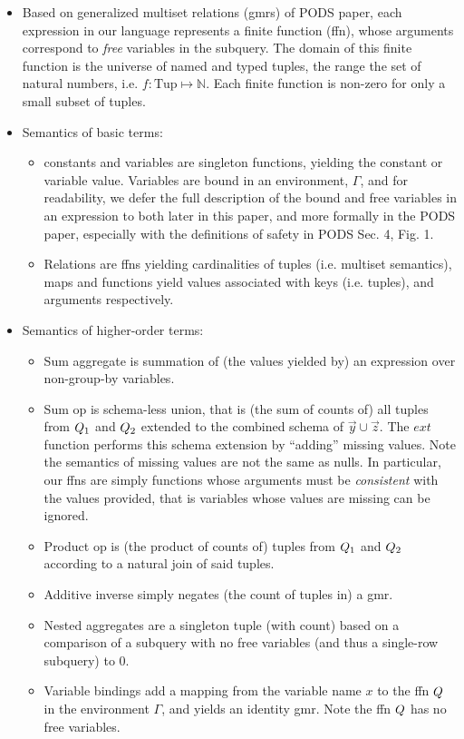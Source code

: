 \begin{itemize}
  \item Based on generalized multiset relations (gmrs) of PODS paper, each
  expression in our language represents a finite function (ffn), whose
  arguments correspond to \textit{free} variables in the subquery. The domain
  of this finite function is the universe of named and typed tuples, the range
  the set of natural numbers, i.e. $f : \mbox{Tup} \mapsto \mathbb{N}$. Each
  finite function is non-zero for only a small subset of tuples.
  \item Semantics of basic terms:
  \begin{itemize}
    \item constants and variables are singleton functions, yielding the
    constant or variable value. Variables are bound in an environment,
    $\Gamma$, and for readability, we defer the full description of the bound
    and free variables in an expression to both later in this paper, and more
    formally in the PODS paper, especially with the definitions of safety in
    PODS Sec. 4, Fig. 1.
    \item Relations are ffns yielding cardinalities of tuples (i.e. multiset
    semantics), maps and functions yield values associated with keys (i.e.
    tuples), and arguments respectively.
  \end{itemize} 
  
  \item Semantics of higher-order terms:
  \begin{itemize}
    \item Sum aggregate is summation of (the values yielded by) an expression
    over non-group-by variables.
    \item Sum op is schema-less union, that is (the sum of counts of) all tuples
    from $Q_1$ and $Q_2$ extended to the combined schema of $\vec{y} \cup
    \vec{z}$. The $ext$ function performs this schema extension by ``adding''
    missing values. Note the semantics of missing values are not the same as
    nulls. In particular, our ffns are simply functions whose arguments must be
    \textit{consistent} with the values provided, that is variables whose
    values are missing can be ignored.
    \item Product op is (the product of counts of) tuples from $Q_1$ and
    $Q_2$ according to a natural join of said tuples.
    \item Additive inverse simply negates (the count of tuples in) a gmr.
    \item Nested aggregates are a singleton tuple (with count) based on a
    comparison of a subquery with no free variables (and thus a single-row
    subquery) to 0.
    \item Variable bindings add a mapping from the variable name $x$ to the
    ffn $Q$ in the environment $\Gamma$, and yields an identity gmr. Note the
    ffn $Q$ has no free variables.
  \end{itemize} 
  
\end{itemize}

